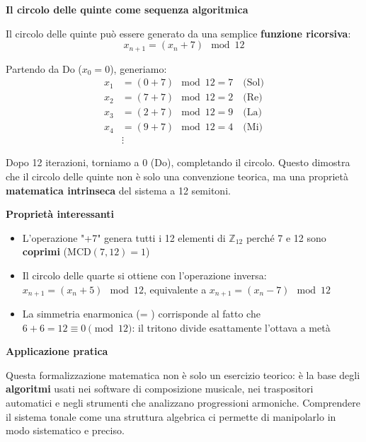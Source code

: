 \begin{matematica}
	\textbf{Il circolo delle quinte come sequenza algoritmica}
	
	Il circolo delle quinte può essere generato da una semplice \textbf{funzione ricorsiva}:
	\[
	x_{n+1} = (x_n + 7) \mod 12
	\]
	
	Partendo da Do ($x_0 = 0$), generiamo:
	\begin{align*}
	x_1 &= (0 + 7) \mod 12 = 7 \quad \text{(Sol)} \\
	x_2 &= (7 + 7) \mod 12 = 2 \quad \text{(Re)} \\
	x_3 &= (2 + 7) \mod 12 = 9 \quad \text{(La)} \\
	x_4 &= (9 + 7) \mod 12 = 4 \quad \text{(Mi)} \\
	&\vdots
	\end{align*}
	
	Dopo 12 iterazioni, torniamo a 0 (Do), completando il circolo. Questo dimostra che il circolo delle quinte non è solo una convenzione teorica, ma una proprietà \textbf{matematica intrinseca} del sistema a 12 semitoni.
	
	\textbf{Proprietà interessanti}
	
	\begin{itemize}
		\item L'operazione "+7" genera tutti i 12 elementi di $\mathbb{Z}_{12}$ perché 7 e 12 sono \textbf{coprimi} ($\text{MCD}(7, 12) = 1$)
		\item Il circolo delle quarte si ottiene con l'operazione inversa: $x_{n+1} = (x_n + 5) \mod 12$, equivalente a $x_{n+1} = (x_n - 7) \mod 12$
		\item La simmetria enarmonica (\Fadiesis  = \Solbemolle ) corrisponde al fatto che $6 + 6 = 12 \equiv 0 \pmod{12}$: il tritono divide esattamente l'ottava a metà
	\end{itemize}
	
	\textbf{Applicazione pratica}
	
	Questa formalizzazione matematica non è solo un esercizio teorico: è la base degli \textbf{algoritmi} usati nei software di composizione musicale, nei traspositori automatici e negli strumenti che analizzano progressioni armoniche. Comprendere il sistema tonale come una struttura algebrica ci permette di manipolarlo in modo sistematico e preciso.
\end{matematica}
